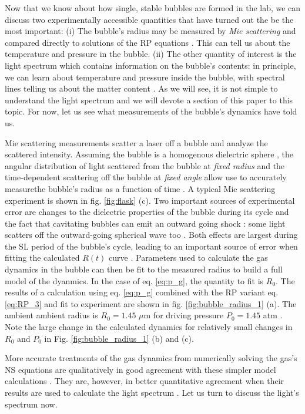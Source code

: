 \documentclass[rmp,aps,nofootinbib,superscriptaddress,floatfix]{revtex4-2}
\begin{document}
Now that we know about how single, stable bubbles are formed in the lab, we can discuss two experimentally accessible quantities that have turned out the be the most important: (i) The bubble's radius may be measured by \emph{Mie scattering} and compared directly to solutions of the RP equations \cite{}. This can tell us about the temperature and pressure in the bubble. (ii) The other quantity of interest is the light spectrum which contains information on the bubble's contents: in principle, we can learn about temperature and pressure inside the bubble, with spectral lines telling us about the matter content \cite{}. As we will see, it is not simple to understand the light spectrum \cite{} and we will devote a section of this paper to this topic. For now, let us see what measurements of the bubble's dynamics have told us. 

Mie scattering measurements scatter a laser off a bubble and analyze the scattered intensity. Assuming the bubble is a homogenous dielectric sphere \cite{}, the angular distribution of light scattered from the bubble at \emph{fixed radius} and the time-dependent scattering off the bubble at \emph{fixed angle} allow use to accurately measurethe bubble's radius as a function of time \cite{}. A typical Mie scattering experiment is shown in fig. \ref{fig:flask} (c). Two important sources of experimental error are changes to the dielectric properties of the bubble during its cycle \cite{} and the fact that cavitating bubbles can emit an outward going shock \cite{}: some light scatters off the outward-going spherical wave too \cite{}. Both effects are largest during the SL period of the bubble's cycle, leading to an important source of error when fitting the calculated $R(t)$ curve \cite{}. Parameters used to calculate the gas dynamics in the bubble can then be fit to the measured radius to build a full model of the dyanmics. In the case of eq. \ref{eq:p_g}, the quantity to fit is $R_0$. The results of a calculation using eq. \ref{eq:p_g} combined with the RP variant eq. \ref{eq:RP_3} and fit to experiment are shown in fig. \ref{fig:bubble_radius_1} (a). The ambient ambient radius is $R_0=1.45$ $\mu$m for driving pressure $P_0=1.45$ atm \cite{barber1997defining,barber1992light}. Note the large change in the calculated dynamics for relatively small changes in $R_0$ and $P_0$ in Fig. \ref{fig:bubble_radius_1} (b) and (c). 

More accurate treatments of the gas dynamics from numerically solving the gas's NS equations are qualitatively in good agreement with these simpler model calculations \cite{brenner2002single,yasui2018acoustic}. They are, however, in better quantitative agreement when their results are used to calculate the light spectrum \cite{an2009diagnosing,an2008spectral,an2006mechanism,flannigan2005plasma,flannigan2006measurement,suslick2008inside}. Let us turn to discuss the light's spectrum now.
\end{document}
